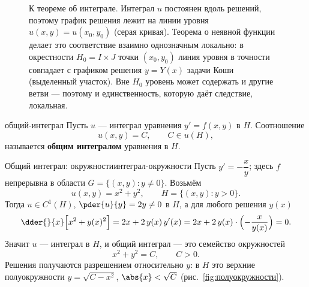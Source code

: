 \begin{figure}[H]
\begin{Addon}
		\caption{К теореме об интеграле. Интеграл $u$ постоянен вдоль решений,
			поэтому график решения лежит на линии уровня $u(x,y) = u(x_0,y_0)$
			(серая кривая). Теорема о неявной функции делает это соответствие
			взаимно однозначным локально: в окрестности $H_0 = I \times J$ точки
			$(x_0,y_0)$ линия уровня в точности совпадает с графиком решения
			$y = Y(x)$ задачи Коши (выделенный участок). Вне $H_0$ уровень может
			содержать и другие ветви --- поэтому и единственность, которую даёт
			следствие, локальная.}
		\label{fig:интеграл-окрестность}
	\end{Addon}
\end{figure}

\begin{Definition}{}{общий-интеграл}
	Пусть $u$ --- интеграл уравнения $y' = f(x,y)$ в $H$. Соотношение
	\[
	u(x,y) = C, \qquad C \in u(H),
	\]
	называется \textbf{общим интегралом} уравнения в $H$.
\end{Definition}

\begin{Example}[addon]{Общий интеграл: окружности}{интеграл-окружности}
	Пусть $y' = -\dfrac{x}{y}$; здесь $f$ непрерывна в области
	$G = \{(x,y) \colon y \neq 0\}$. Возьмём
	\[
	u(x,y) = x^2 + y^2, \qquad H = \{(x,y) \colon y > 0\}.
	\]
	Тогда $u \in C^1(H)$, $\pder{u}{y} = 2y \neq 0$ в $H$, а для любого
	решения $y(x)$
	\[
	\dder{}{x}\Bigl[x^2 + y(x)^2\Bigr]
	= 2x + 2\,y(x)\,y'(x)
	= 2x + 2\,y(x)\cdot\Bigl(-\frac{x}{y(x)}\Bigr) = 0.
	\]
	Значит $u$ --- интеграл в $H$, и общий интеграл --- это семейство
	окружностей
	\[
	x^2 + y^2 = C, \qquad C > 0.
	\]
	Решения получаются разрешением относительно $y$: в $H$ это верхние
	полуокружности $y = \sqrt{C - x^2}$, $\abs{x} < \sqrt{C}$
	(рис.~\ref{fig:полуокружности}).
\end{Example}

